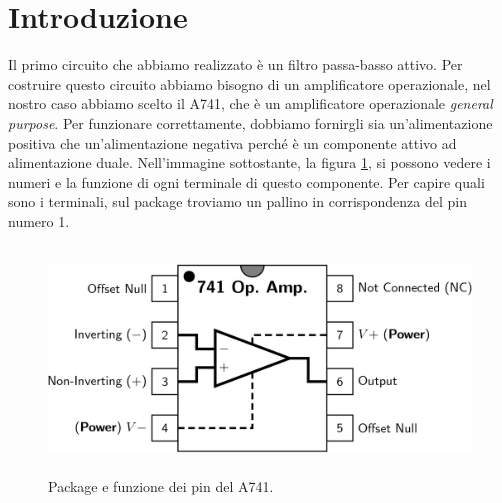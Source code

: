 \documentclass{report}
\begin{document}
\section{Introduzione}
Il primo circuito che abbiamo realizzato è un filtro passa-basso attivo. Per costruire questo circuito abbiamo bisogno di un amplificatore operazionale, nel nostro caso abbiamo scelto il \textmu A741, che è un amplificatore operazionale \textit{general purpose}. Per funzionare correttamente, dobbiamo fornirgli sia un'alimentazione positiva che un'alimentazione negativa perché è un componente attivo ad alimentazione duale. Nell'immagine sottostante, la figura \ref{figura:741}, si possono vedere i numeri e la funzione di ogni terminale di questo componente. Per capire quali sono i terminali, sul package troviamo un pallino in corrispondenza del pin numero 1.  \par
\begin{figure}[h]
\centering
\includegraphics[height=6cm]{immagini/741pinout}
\caption{Package e funzione dei pin del \textmu A741.}
\label{figura:741}
\end{figure}
\end{document}

